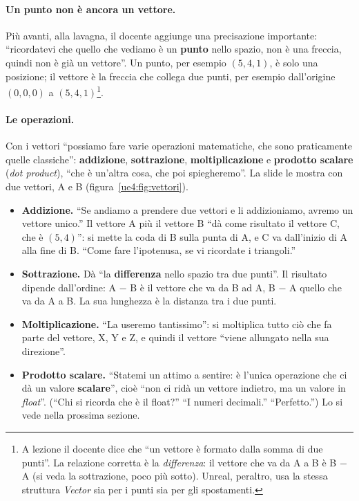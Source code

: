 \paragraph{Un punto non è ancora un vettore.} Più avanti, alla lavagna, il docente
aggiunge una precisazione importante: ``ricordatevi che quello che vediamo è un
\textbf{punto} nello spazio, non è una freccia, quindi non è già un vettore''. Un
punto, per esempio $(5, 4, 1)$, è solo una posizione; il vettore è la freccia che
collega due punti, per esempio dall'origine $(0,0,0)$ a $(5,4,1)$\footnote{A lezione il
docente dice che ``un vettore è formato dalla somma di due punti''. La relazione
corretta è la \emph{differenza}: il vettore che va da A a B è B $-$ A (si veda la
sottrazione, poco più sotto). Unreal, peraltro, usa la stessa struttura
\emph{Vector} sia per i punti sia per gli spostamenti.}.

\paragraph{Le operazioni.} Con i vettori ``possiamo fare varie operazioni matematiche,
che sono praticamente quelle classiche'': \textbf{addizione}, \textbf{sottrazione},
\textbf{moltiplicazione} e \textbf{prodotto scalare} (\emph{dot product}), ``che è
un'altra cosa, che poi spiegheremo''. La slide le mostra con due vettori, A e B
(figura~\ref{ue4:fig:vettori}).
\begin{itemize}
  \item \textbf{Addizione.} ``Se andiamo a prendere due vettori e li addizioniamo,
        avremo un vettore unico.'' Il vettore A più il vettore B ``dà come risultato
        il vettore C, che è $(5,4)$'': si mette la coda di B sulla punta di A, e C va
        dall'inizio di A alla fine di B. ``Come fare l'ipotenusa, se vi ricordate i
        triangoli.''
  \item \textbf{Sottrazione.} Dà ``la \textbf{differenza} nello spazio tra due
        punti''. Il risultato dipende dall'ordine: A $-$ B è il vettore che va da B
        ad A, B $-$ A quello che va da A a B. La sua lunghezza è la distanza tra i due
        punti.
  \item \textbf{Moltiplicazione.} ``La useremo tantissimo'': si moltiplica tutto ciò
        che fa parte del vettore, X, Y e Z, e quindi il vettore ``viene allungato nella
        sua direzione''.
  \item \textbf{Prodotto scalare.} ``Statemi un attimo a sentire: è l'unica operazione
        che ci dà un valore \textbf{scalare}'', cioè ``non ci ridà un vettore indietro,
        ma un valore in \emph{float}''. (``Chi si ricorda che è il float?'' ``I numeri
        decimali.'' ``Perfetto.'') Lo si vede nella prossima sezione.
\end{itemize}

